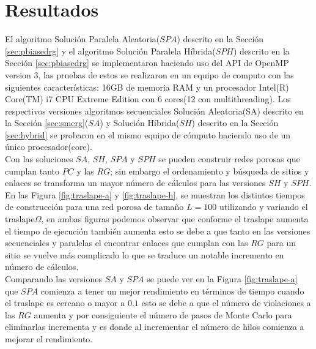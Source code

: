 \chapter{Resultados}
\label{champ:results}
\bigskip
\barra
\bigskip
El algoritmo Solución Paralela Aleatoria($SPA$) descrito en la Sección \ref{sec:pbiasedrg} y el algoritmo Solución Paralela Híbrida($SPH$) descrito en la Sección \ref{sec:pbiasedrg} se implementaron haciendo uso del API de OpenMP version 3, las pruebas de estos se realizaron en un equipo de computo con las siguientes características: 16GB de memoria  RAM y un procesador Intel(R) Core(TM) i7 CPU  Extreme Edition con 6 cores(12 con multithreading). Los respectivos versiones  algoritmos secuenciales Solución Aleatoria(SA) descrito en la Sección \ref{sec:smcrg}($SA$) y Solución Híbrida($SH$) descrito en la Sección \ref{sec:hybrid} se probaron en el mismo equipo de cómputo haciendo uso de un único procesador(core).\\

Con las soluciones $SA$, $SH$, $SPA$ y $SPH$ se pueden construir redes porosas que cumplan tanto $PC$ y las $RG$; sin embargo el ordenamiento y búsqueda de sitios y enlaces se transforma un mayor número de cálculos para las versiones $SH$ y $SPH$. En las Figura \ref{fig:traslape-a} y \ref{fig:traslape-h}, se muestran los distintos tiempos de construcción para una red porosa de tamaño $L=100$ utilizando y variando el traslape$\Omega$, en ambas figuras podemos observar que conforme el traslape aumenta el tiempo de ejecución también aumenta esto se debe a que tanto en las versiones secuenciales y paralelas el encontrar enlaces que cumplan con las $RG$ para un sitio se vuelve más complicado lo que se traduce un notable incremento en número de cálculos.\\

Comparando las versiones $SA$ y $SPA$ se puede ver en la Figura \ref{fig:traslape-a} que $SPA$ comienza a tener un mejor rendimiento en términos de tiempo cuando el traslape es cercano o mayor a $0.1$ esto se debe a que el número de violaciones a las $RG$ aumenta y por consiguiente el número de pasos de Monte Carlo para eliminarlas incrementa y es donde al incrementar el número de hilos comienza a mejorar el rendimiento.\\

